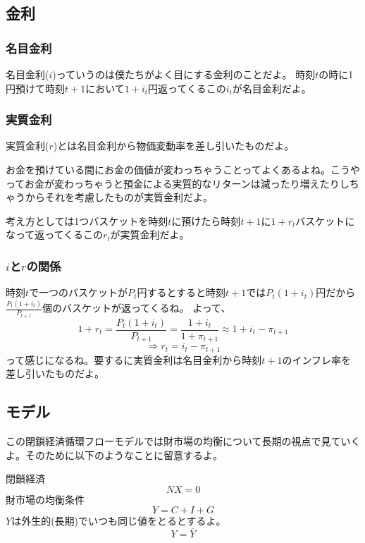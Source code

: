 \documentclass[a4paper, 12pt]{article}
\begin{document}
\subsection{金利}
\subsubsection{名目金利}
名目金利($i$)っていうのは僕たちがよく目にする金利のことだよ。
時刻$t$の時に1円預けて時刻$t+1$において$1+i_t$円返ってくるこの$i_t$が名目金利だよ。
\subsubsection{実質金利}
実質金利($r$)とは名目金利から物価変動率を差し引いたものだよ。

お金を預けている間にお金の価値が変わっちゃうことってよくあるよね。こうやってお金が変わっちゃうと預金による実質的なリターンは減ったり増えたりしちゃうからそれを考慮したものが実質金利だよ。

考え方としては1つバスケットを時刻$t$に預けたら時刻$t+1$に$1+r_t$バスケットになって返ってくるこの$r_t$が実質金利だよ。
\subsubsection{$i$と$r$の関係}
時刻$t$で一つのバスケットが$P_t$円するとすると時刻$t+1$では$P_t(1+i_t)$円だから$\displaystyle \frac{P_t(1+i_t)}{P_{t+1}}$個のバスケットが返ってくるね。
よって、
\begin{equation*}
  1+r_t=\frac{P_t(1+i_t)}{P_{t+1}}=\frac{1+i_t}{1+\pi_{t+1}} \approx 1+i_t-\pi_{t+1}
\end{equation*}
\begin{equation*}
  \Rightarrow r_t=i_t-\pi_{t+1}
\end{equation*}
って感じになるね。要するに実質金利は名目金利から時刻$t+1$のインフレ率を差し引いたものだよ。
\subsection{モデル}
この閉鎖経済循環フローモデルでは財市場の均衡について長期の視点で見ていくよ。そのために以下のようなことに留意するよ。

閉鎖経済
\begin{equation*}
  NX=0
\end{equation*}
財市場の均衡条件
\begin{equation*}
  Y=C+I+G
\end{equation*}
$Y$は外生的(長期)でいつも同じ値をとるとするよ。
\begin{equation*}
  Y=\overline{Y}
\end{equation*}
\end{document}
